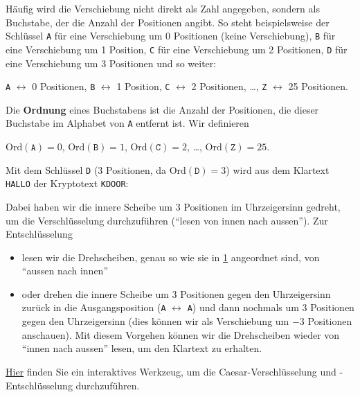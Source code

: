 \begin{myremark}\label{myremark:buchstaben_als_zahlen}
	Häufig wird die Verschiebung nicht direkt als Zahl angegeben, sondern als Buchstabe, der die Anzahl der Positionen angibt. So steht beispielsweise der Schlüssel \texttt{A} für eine Verschiebung um 0 Positionen (keine Verschiebung), \texttt{B} für eine Verschiebung um 1 Position, \texttt{C} für eine Verschiebung um 2 Positionen, \texttt{D} für eine Verschiebung um 3 Positionen und so weiter:
	\begin{center}
		\texttt{A} $\leftrightarrow$ 0 Positionen, \texttt{B} $\leftrightarrow$ 1 Position, \texttt{C} $\leftrightarrow$ 2 Positionen, \dots , \texttt{Z} $\leftrightarrow$ 25 Positionen.
	\end{center}
\end{myremark}

\begin{mydefinition}\label{mydefinition:ordnung_buchstabe}
	Die \textbf{Ordnung} eines Buchstabens ist die Anzahl der Positionen, die dieser Buchstabe im Alphabet von \texttt{A} entfernt ist. Wir definieren
	\begin{center}
		$\text{Ord}(\texttt{A}) = 0$, $\text{Ord}(\texttt{B}) = 1$, $\text{Ord}(\texttt{C}) = 2$, \dots, $\text{Ord}(\texttt{Z}) = 25$.
	\end{center}
\end{mydefinition}

\begin{myexample}
	Mit dem Schlüssel \texttt{D} (3 Positionen, da $\text{Ord}(\texttt{D}) = 3$)  wird aus dem Klartext \texttt{HALLO} der Kryptotext \texttt{KDOOR}:
	\begin{figure}[H]
		\centering
		\caesar[3]
		\label{fig:caesar_3}
	\end{figure}
	Dabei haben wir die innere Scheibe um 3 Positionen im Uhrzeigersinn gedreht, um die Verschlüsselung durchzuführen (\enquote{lesen von innen nach aussen}). Zur Entschlüsselung
	\begin{itemize}
		\item lesen wir die Drehscheiben, genau so wie sie in \cref{fig:caesar_3} angeordnet sind, von \enquote{aussen nach innen}
		\item oder drehen die innere Scheibe um 3 Positionen gegen den Uhrzeigersinn zurück in die Ausgangsposition (\texttt{A} $\leftrightarrow$ \texttt{A}) und dann nochmals um 3 Positionen gegen den Uhrzeigersinn (dies können wir als Verschiebung um $-3$ Positionen anschauen).
		      Mit diesem Vorgehen können wir die Drehscheiben wieder von \enquote{innen nach aussen} lesen, um den Klartext zu erhalten.
	\end{itemize}
	\href{https://www.101computing.net/cipher-wheel.html}{Hier} finden Sie ein interaktives Werkzeug, um die Caesar-Verschlüsselung und -Entschlüsselung durchzuführen.
\end{myexample}


